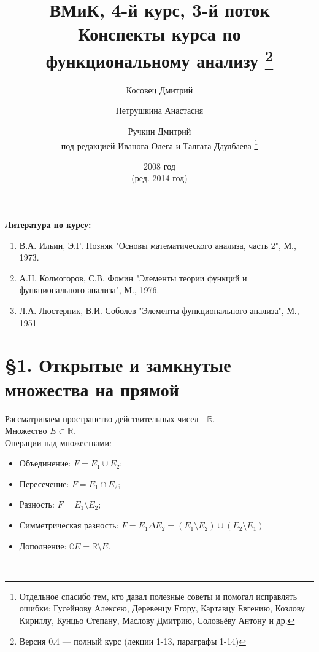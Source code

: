 \documentclass[12pt,a4paper, titlepage]{article}
\begin{document}
\author{Косовец Дмитрий \and Петрушкина Анастасия \and Ручкин Дмитрий \\
под редакцией Иванова Олега и Талгата Даулбаева \thanks{Отдельное спасибо тем, кто давал полезные советы и помогал исправлять ошибки: Гусейнову Алексею, Деревенцу Егору, Картавцу Евгению, Козлову Кириллу, Кунцьо Степану, Маслову Дмитрию, Соловьёву Антону и др.}}
\title{ВМиК, 4-й курс, 3-й поток \\ Конспекты курса по функциональному анализу \thanks{Версия 0.4 --- полный курс (лекции 1-13, параграфы 1-14) }}
\date{2008 год \\ (ред. 2014 год)}


\maketitle


\textbf{Литература по курсу:}
\begin{enumerate}
\item В.А. Ильин, Э.Г. Позняк "Основы математического анализа, часть 2", М., 1973.
\item А.Н. Колмогоров, С.В. Фомин "Элементы теории функций и функционального анализа", М., 1976.
\item Л.А. Люстерник, В.И. Соболев "Элементы функционального анализа", М., 1951
\end{enumerate}

\parindent=0cm

\pagebreak

\section*{\S 1. Открытые и замкнутые множества на прямой}

 Рассматриваем пространство действительных чисел - $\mathbb{R}$.\\
Множество $E\subset\mathbb{R}$.\\

Операции над множествами:
\begin{itemize}
\item Объединение: $F = E_1 \cup E_2$;
\item Пересечение: $F = E_1 \cap E_2$;
\item Разность: $F = E_1 \setminus E_2$;
\item Симметрическая разность: $F = E_1 \Delta E_2 = (E_1 \setminus E_2) \cup (E_2 \setminus E_1)$
\item Дополнение: $ \complement E = \mathbb{R} \setminus E$.
\end{itemize}\
\end{document}
